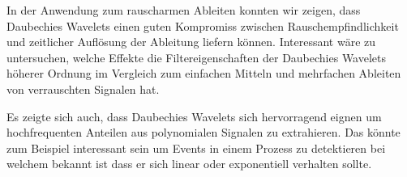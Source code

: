 \begin{refsection}
In der Anwendung zum rauscharmen Ableiten konnten wir zeigen, dass Daubechies
Wavelets einen guten Kompromiss zwischen Rauschempfindlichkeit und zeitlicher
Auflösung der Ableitung liefern können. Interessant wäre zu untersuchen,
welche Effekte die Filtereigenschaften der Daubechies Wavelets höherer Ordnung
im Vergleich zum einfachen Mitteln und mehrfachen Ableiten von verrauschten
Signalen hat.

Es zeigte sich auch, dass Daubechies Wavelets sich hervorragend eignen um
hochfrequenten Anteilen aus polynomialen Signalen zu extrahieren. Das könnte
zum Beispiel interessant sein um Events in einem Prozess zu detektieren bei
welchem bekannt ist dass er sich linear oder exponentiell verhalten sollte.

\printbibliography[heading=subbibliography]
\end{refsection}
